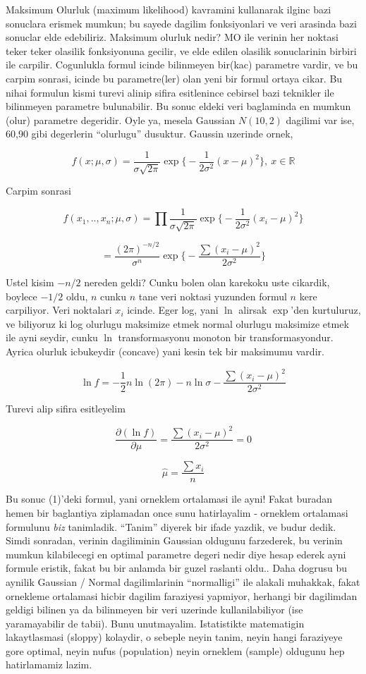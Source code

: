 \documentclass[12pt,fleqn]{article}\usepackage{../common}
\begin{document}
Maksimum Olurluk (maximum likelihood) kavramini kullanarak ilginc bazi
sonuclara erismek mumkun; bu sayede dagilim fonksiyonlari ve veri arasinda
bazi sonuclar elde edebiliriz. Maksimum olurluk nedir? MO ile verinin her
noktasi teker teker olasilik fonksiyonuna gecilir, ve elde edilen olasilik
sonuclarinin birbiri ile carpilir. Cogunlukla formul icinde bilinmeyen
bir(kac) parametre vardir, ve bu carpim sonrasi, icinde bu parametre(ler)
olan yeni bir formul ortaya cikar. Bu nihai formulun kismi turevi alinip
sifira esitlenince cebirsel bazi teknikler ile bilinmeyen parametre
bulunabilir. Bu sonuc eldeki veri baglaminda en mumkun (olur) parametre
degeridir. Oyle ya, mesela Gaussian $N(10,2)$ dagilimi var ise, 60,90 gibi
degerlerin ``olurlugu'' dusuktur. Gaussin uzerinde ornek,

$$ f(x;\mu,\sigma) = \frac{1}{\sigma\sqrt{2\pi}} 
\exp \bigg\{ - \frac{1}{2\sigma^2}(x-\mu)^2  \bigg\}
, \ x \in \mathbb{R}
$$
 
Carpim sonrasi

$$ f(x_1,..,x_n;\mu,\sigma) = 
\prod \frac{1}{\sigma\sqrt{2\pi}} 
\exp \bigg\{ - \frac{1}{2\sigma^2}(x_i-\mu)^2  \bigg\}
$$

$$ =
\frac{(2\pi)^{-n/2}}{\sigma^n}
\exp \bigg\{ - \frac{\sum (x_i-\mu)^2}{2\sigma^2}  \bigg\}
$$

Ustel kisim $-n/2$ nereden geldi? Cunku bolen olan karekoku uste cikardik,
boylece $-1/2$ oldu, $n$ cunku $n$ tane veri noktasi yuzunden formul $n$
kere carpiliyor. Veri noktalari $x_i$ icinde. Eger log, yani $\ln$ alirsak
$\exp$'den kurtuluruz, ve biliyoruz ki log olurlugu maksimize etmek normal
olurlugu maksimize etmek ile ayni seydir, cunku $\ln$ transformasyonu
monoton bir transformasyondur. Ayrica olurluk icbukeydir (concave) yani
kesin tek bir maksimumu vardir. 

$$ \ln f = -\frac{1}{2} n \ln (2\pi) 
- n \ln \sigma - 
\frac{\sum (x_i-\mu)^2}{2\sigma^2}  
$$

Turevi alip sifira esitleyelim

$$ \frac{\partial (\ln f)}{\partial \mu} =
\frac{\sum (x_i-\mu)^2}{2\sigma^2}   = 0 
$$

$$ \hat{\mu} = \frac{\sum x_i }{n} $$


Bu sonuc (1)'deki formul, yani orneklem ortalamasi ile ayni! Fakat buradan
hemen bir baglantiya ziplamadan once sunu hatirlayalim - orneklem
ortalamasi formulunu {\em biz} tanimladik. ``Tanim'' diyerek bir ifade
yazdik, ve budur dedik. Simdi sonradan, verinin dagiliminin Gaussian
oldugunu farzederek, bu verinin mumkun kilabilecegi en optimal parametre
degeri nedir diye hesap ederek ayni formule eristik, fakat bu bir anlamda
bir guzel raslanti oldu.. Daha dogrusu bu aynilik Gaussian / Normal
dagilimlarinin ``normalligi'' ile alakali muhakkak, fakat ornekleme
ortalamasi hicbir dagilim faraziyesi yapmiyor, herhangi bir dagilimdan
geldigi bilinen ya da bilinmeyen bir veri uzerinde kullanilabiliyor (ise
yaramayabilir de tabii). Bunu unutmayalim. Istatistikte matematigin
lakaytlasmasi (sloppy) kolaydir, o sebeple neyin tanim, neyin hangi
faraziyeye gore optimal, neyin nufus (population) neyin orneklem (sample)
oldugunu hep hatirlamamiz lazim.
\end{document}
